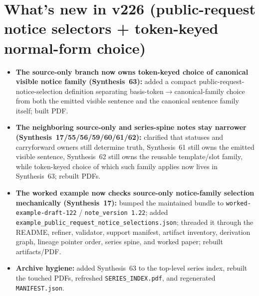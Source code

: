 \documentclass[11pt]{article}
\begin{document}
\section{What's new in v226 (public-request notice selectors + token-keyed normal-form choice)}
\begin{itemize}[leftmargin=*]
\item \textbf{The source-only branch now owns token-keyed choice of canonical visible notice family (Synthesis~63):} added a compact public-request-notice-selection definition separating basis-token$\to$canonical-family choice from both the emitted visible sentence and the canonical sentence family itself; built PDF.
\item \textbf{The neighboring source-only and series-spine notes stay narrower (Synthesis~17/55/56/59/60/61/62):} clarified that statuses and carryforward owners still determine truth, Synthesis~61 still owns the emitted visible sentence, Synthesis~62 still owns the reusable template/slot family, while token-keyed choice of which such family applies now lives in Synthesis~63; rebuilt PDFs.
\item \textbf{The worked example now checks source-only notice-family selection mechanically (Synthesis~17):} bumped the maintained bundle to \texttt{worked-example-draft-122} / \texttt{note\_version 1.22}; added \texttt{example\_public\_request\_notice\_selections.json}; threaded it through the README, refiner, validator, support manifest, artifact inventory, derivation graph, lineage pointer order, series spine, and worked paper; rebuilt artifacts/PDF.
\item \textbf{Archive hygiene:} added Synthesis~63 to the top-level series index, rebuilt the touched PDFs, refreshed \texttt{SERIES\_INDEX.pdf}, and regenerated \texttt{MANIFEST.json}.
\end{itemize}
\end{document}
